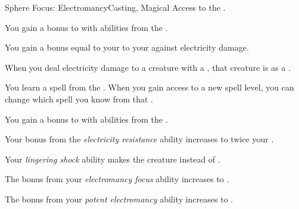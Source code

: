     \begin{feat}{Sphere Focus: Electromancy}{Casting, Magical}
        \featpre Access to the  .

         You gain a  bonus to  with abilities from the  .

         You gain a bonus equal to your  to your  against electricity damage.

         When you deal electricity damage to a creature with a , that creature is  as a .

         You learn a spell from the  .
        When you gain access to a new spell level, you can change which spell you know from that .

         You gain a  bonus to  with abilities from the  .

         Your bonus from the \textit{electricity resistance} ability increases to twice your .

         Your \textit{lingering shock} ability makes the creature  instead of .

         The bonus from your \textit{electromancy focus} ability increases to .

         The bonus from your \textit{potent electromancy} ability increases to .
    \end{feat}

